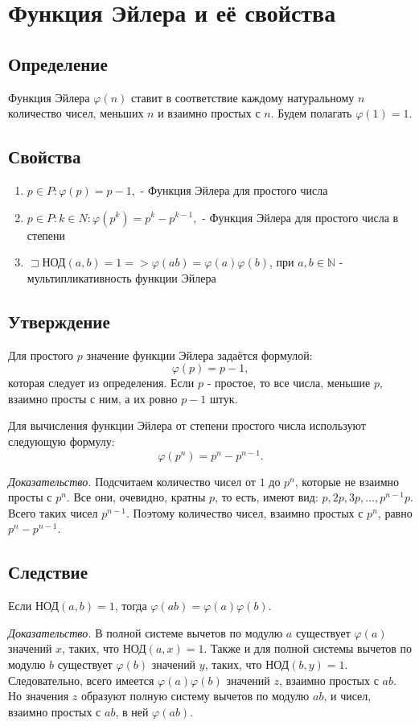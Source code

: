 \documentclass[12pt]{article}
\begin{document}
\setcounter{section}{7}

\section{Функция Эйлера и её свойства}

\subsection{Определение} Функция Эйлера $\varphi(n)$ ставит в соответствие каждому натуральному $n$ количество чисел, меньших $n$ и взаимно простых с $n$. Будем полагать $\varphi(1)=1$.

\subsection{Свойства} 
\begin{enumerate}
    \item $p\in P:\varphi(p)=p-1,$ - Функция Эйлера для простого числа
    \item $p\in P:k\in N:\varphi(p^{k})=p^{k}-p^{k-1},$ - Функция Эйлера для простого числа в степени
    \item $\sqsupset$НОД$(a,b)=1=>\varphi(ab)=\varphi(a)\varphi(b)$, при $a,b\in \mathbb{N}$ - мультипликативность функции Эйлера
\end{enumerate}

\subsection{Утверждение} Для простого $p$ значение функции Эйлера задаётся формулой: \[\varphi(p)=p-1,\] которая следует из определения. Если $p$ - простое, то все числа, меньшие $p$, взаимно просты с ним, а их ровно $p-1$ штук.
\par Для вычисления функции Эйлера от степени простого числа используют следующую формулу: \[\varphi(p^{n})=p^{n}-p^{n-1}.\] 
\par \textit{Доказательство.} Подсчитаем количество чисел от $1$ до $p^{n}$, которые не взаимно просты с $p^{n}$. Все они, очевидно, кратны $p$, то есть, имеют вид: $p,2p,3p,\dots,p^{n-1}p$. Всего таких чисел $p^{n-1}$. Поэтому количество чисел, взаимно простых с $p^{n}$, равно $p^{n}-p^{n-1}$.

\subsection{Следствие} Если НОД$(a,b)=1$, тогда $\varphi(ab)=\varphi(a)\varphi(b)$.
\par \textit{Доказательство.} В полной системе вычетов по модулю $a$ существует $\varphi(a)$ значений $x$, таких, что НОД$(a,x)=1$. Также и для полной системы вычетов по модулю $b$ существует $\varphi(b)$ значений $y$, таких, что НОД$(b,y)=1$. Следовательно, всего имеется $\varphi(a)\varphi(b)$ значений $z$, взаимно простых с $ab$. Но значения $z$ образуют полную систему вычетов по модулю $ab$, и чисел, взаимно простых с $ab$, в ней $\varphi(ab)$.
\end{document}

